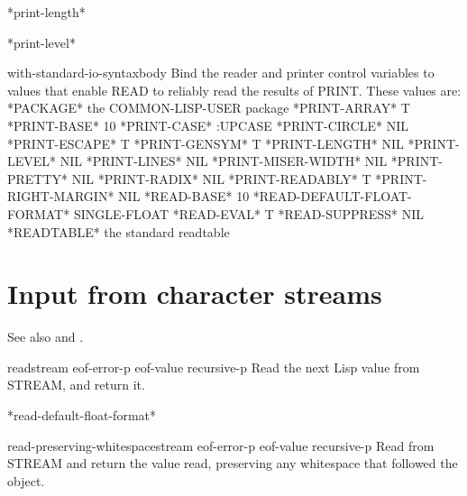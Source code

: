 \documentclass[10pt,english]{book}
\begin{document}
\begin{variable}{*print-length*}{}
  
\end{variable}

\begin{variable}{*print-level*}{}
  
\end{variable}

\begin{macro}{with-standard-io-syntax}{\body body}
  Bind the reader and printer control variables to values that enable READ
   to reliably read the results of PRINT. These values are:
       *PACKAGE*                        the COMMON-LISP-USER package
       *PRINT-ARRAY*                    T
       *PRINT-BASE*                     10
       *PRINT-CASE*                     :UPCASE
       *PRINT-CIRCLE*                   NIL
       *PRINT-ESCAPE*                   T
       *PRINT-GENSYM*                   T
       *PRINT-LENGTH*                   NIL
       *PRINT-LEVEL*                    NIL
       *PRINT-LINES*                    NIL
       *PRINT-MISER-WIDTH*              NIL
       *PRINT-PRETTY*                   NIL
       *PRINT-RADIX*                    NIL
       *PRINT-READABLY*                 T
       *PRINT-RIGHT-MARGIN*             NIL
       *READ-BASE*                      10
       *READ-DEFAULT-FLOAT-FORMAT*      SINGLE-FLOAT
       *READ-EVAL*                      T
       *READ-SUPPRESS*                  NIL
       *READTABLE*                      the standard readtable
\end{macro}

\section{Input from character streams}
\label{sec:input-from-character}

See also  and .

\begin{function}{read}{\op stream eof-error-p eof-value recursive-p}
  Read the next Lisp value from STREAM, and return it.
\end{function}

\begin{variable}{*read-default-float-format*}{}
  
\end{variable}

\begin{function}{read-preserving-whitespace}{\op stream eof-error-p eof-value recursive-p}
  Read from STREAM and return the value read, preserving any whitespace
   that followed the object.
\end{function}
\end{document}
